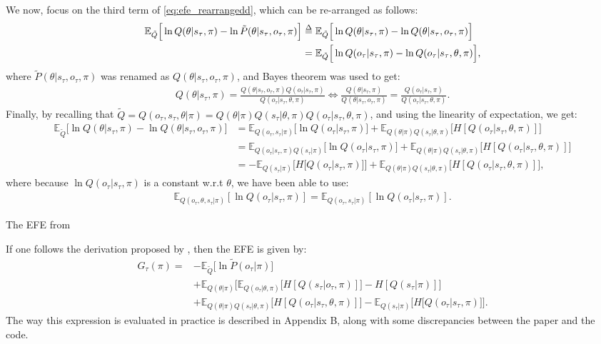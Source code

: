 \documentclass[twoside,11pt]{article}
\makeatletter
\def\delequal{\mathrel{\ensurestackMath{\stackon[1pt]{=}{\scriptstyle\Delta}}}}
\newcounter{subsubsubsection}[subsubsection]
\def\subsubsubsection{\@startsection
     {subsubsubsection}{4}{\z@} {-3.25ex plus -1
     ex minus -.2ex}{1.5ex plus .2ex}{\normalsize\bf}}
\makeatother
\begin{document}
We now, focus on the third term of \eqref{eq:efe_rearrangedd}, which can be re-arranged as follows:
\begin{align*}
\mathbb{E}_{\tilde{Q}}\Big[ \ln Q(\theta|s_\tau, \pi) - \ln \tilde{P}(\theta|s_\tau,o_\tau,\pi) \Big] &\delequal \mathbb{E}_{\tilde{Q}}\Big[ \ln Q(\theta|s_\tau, \pi) - \ln Q(\theta|s_\tau,o_\tau,\pi) \Big] \\
&= \mathbb{E}_{\tilde{Q}}\Big[ \ln Q(o_\tau|s_\tau, \pi) - \ln Q(o_\tau|s_\tau,\theta,\pi) \Big],
\end{align*}
where $\tilde{P}(\theta|s_\tau,o_\tau,\pi)$ was renamed as $Q(\theta|s_\tau,o_\tau,\pi)$, and Bayes theorem was used to get:
\begin{align*}
Q(\theta|s_\tau, \pi)
= \frac{Q(\theta|s_\tau,o_\tau,\pi)Q(o_\tau|s_\tau, \pi)}{Q(o_\tau|s_\tau,\theta,\pi)} \Leftrightarrow \frac{Q(\theta|s_\tau, \pi)}{Q(\theta|s_\tau,o_\tau,\pi)}
= \frac{Q(o_\tau|s_\tau, \pi)}{Q(o_\tau|s_\tau,\theta,\pi)}.
\end{align*}
Finally, by recalling that $\tilde{Q} = Q(o_\tau, s_\tau, \theta|\pi) = Q(\theta|\pi)Q(s_\tau|\theta,\pi)Q(o_\tau|s_\tau,\theta,\pi)$, and using the linearity of expectation, we get:
\begin{align*}
\mathbb{E}_{\tilde{Q}}\Big[ \ln Q(\theta|s_\tau, \pi) - \ln Q(\theta|s_\tau,o_\tau,\pi) \Big] &= \mathbb{E}_{Q(o_\tau,s_\tau|\pi)}\Big[ \ln Q(o_\tau|s_\tau, \pi)\Big] + \mathbb{E}_{Q(\theta|\pi)Q(s_\tau|\theta,\pi)}\Big[H[Q(o_\tau|s_\tau,\theta,\pi)] \Big]\\
&= \mathbb{E}_{Q(o_\tau|s_\tau,\pi)Q(s_\tau|\pi)}\Big[ \ln Q(o_\tau|s_\tau, \pi)\Big] + \mathbb{E}_{Q(\theta|\pi)Q(s_\tau|\theta,\pi)}\Big[H[Q(o_\tau|s_\tau,\theta,\pi)] \Big]\\
&= - \mathbb{E}_{Q(s_\tau|\pi)}\Big[ H\big[ Q(o_\tau|s_\tau, \pi) \big] \Big] + \mathbb{E}_{Q(\theta|\pi)Q(s_\tau|\theta,\pi)}\Big[H[Q(o_\tau|s_\tau,\theta,\pi)] \Big],
\end{align*}
where because $\ln Q(o_\tau|s_\tau, \pi)$ is a constant w.r.t $\theta$, we have been able to use:
\begin{align*}
\mathbb{E}_{Q(o_\tau,\theta,s_\tau|\pi)}[ \ln Q(o_\tau|s_\tau, \pi)] = \mathbb{E}_{Q(o_\tau,s_\tau|\pi)}[ \ln Q(o_\tau|s_\tau, \pi)].
\end{align*}

\subsubsubsection{The EFE from \citet{DeepAIwithMCMC}}

If one follows the derivation proposed by \citet{DeepAIwithMCMC}, then the EFE is given by:
\begin{align}
G_{\tau}(\pi) = &- \mathbb{E}_{\tilde{Q}}\Big[ \ln \tilde{P}(o_\tau|\pi)\Big]\nonumber\\
&+ \mathbb{E}_{Q(\theta|\pi)}\Big[ \mathbb{E}_{Q(o_\tau|\theta,\pi)}\big[H[Q(s_\tau|o_\tau, \pi)]\big] - H[Q(s_\tau|\pi)] \Big]\nonumber\\
&+ \mathbb{E}_{Q(\theta|\pi)Q(s_\tau|\theta,\pi)}\Big[H[Q(o_\tau|s_\tau,\theta,\pi)] \Big] - \mathbb{E}_{Q(s_\tau|\pi)}\Big[ H\big[ Q(o_\tau|s_\tau, \pi) \big] \Big].\label{eq:efe_rearranged_fountas}
\end{align}
The way this expression is evaluated in practice is described in Appendix B, along with some discrepancies between the paper and the code.
\end{document}
